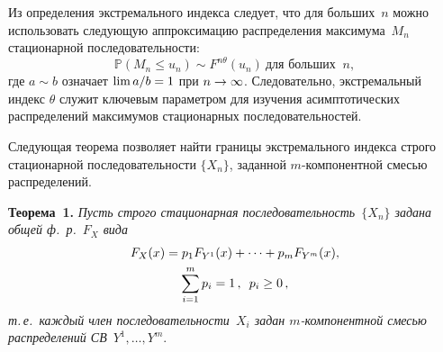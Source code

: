 \begin{multicols}{2}
Из определения экстремального индекса следует, что для больших~$n$ можно 
использовать следующую аппроксимацию  распределения максимума~$M_n$ стационарной 
последовательности:
\begin{equation*}
    \mathbb{P}\left(M_n\le u_n\right) \sim F^{n \theta } (u_n) \ \mbox{для больших } \ n,
    \end{equation*}
где $a\sim b$ означает $\lim a/b \hm=1$ при $n\hm\to\infty$.  Следовательно, 
экстремальный индекс $\theta$ служит ключевым параметром для изучения 
асимптотических  распределений максимумов стационарных последовательностей.



Следующая теорема позволяет найти границы  экстремального индекса  строго 
стационарной последовательности $\{ X_n \}$, заданной $m$-ком\-по\-нент\-ной смесью 
распределений.

\smallskip

\noindent
\textbf{Теорема~1.}
\textit{Пусть строго стационарная последовательность~$\{ X_n \}$ задана общей  ф.~р.~$F_X$ вида}
\begin{multline*}
    F_X(x)=p_1 F_{Y^1}(x)+ \dots + p_m F_{Y^m}(x),\\
      \sum\limits_{i=1}^m p_i= 1\,, \enskip p_i\ge 0\,,
\end{multline*}
\textit{т.\,е.\ каждый член последовательности~$X_i$  задан \mbox{$m$-ком}\-по\-нент\-ной смесью 
распределений СВ}\ $Y^1,\dots, Y^m$.


\end{multicols}
